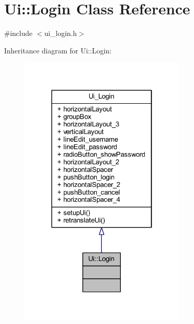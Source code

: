 \hypertarget{class_ui_1_1_login}{}\section{Ui\+:\+:Login Class Reference}
\label{class_ui_1_1_login}


{\ttfamily \#include $<$ui\+\_\+login.\+h$>$}



Inheritance diagram for Ui\+:\+:Login\+:\nopagebreak
\begin{figure}[H]
\begin{center}
\leavevmode
\includegraphics[width=226pt]{class_ui_1_1_login__inherit__graph}
\end{center}
\end{figure}


